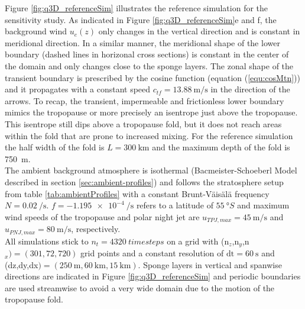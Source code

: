 Figure \ref{fig:q3D_referenceSim} illustrates the reference simulation for the sensitivity study. As indicated in Figure \ref{fig:q3D_referenceSim}e and f, the background wind $u_e(z)$ only changes in the vertical direction and is constant in meridional direction. In a similar manner, the meridional shape of the lower boundary (dashed lines in horizonal cross sections) is constant in the center of the domain and only changes close to the sponge layers. The zonal shape of the transient boundary is prescribed by the cosine function (equation (\ref{equ:cosMtn})) and it propagates with a constant speed $c_{tf}=\SI{13.88}{\meter\per\second}$ in the direction of the arrows. To recap, the transient, impermeable and frictionless lower boundary mimics the tropopause or more precisely an isentrope just above the tropopause. This isentrope still dips above a tropopause fold, but it does not reach areas within the fold that are prone to increased mixing. For the reference simulation the half width of the fold is $L = \SI{300}{\kilo\meter}$ and the maximum depth of the fold is \SI{750}{\meter}. \\
The ambient background atmosphere is isothermal (Bacmeister-Schoeberl Model described in section \ref{sec:ambient-profiles}) and follows the stratosphere setup from table \ref{tab:ambientProfiles} with a constant Brunt-Väisälä frequency $N=\SI{0.02}{\per\second}$. $f = \SI{-1.195e-4}{\per\second}$ refers to a latitude of $\SI{55}{\degree S}$ and maximum wind speeds of the tropopause and polar night jet are $u_{TPJ,max}=\SI{45}{\meter\per\second}$ and $u_{PNJ,max}=\SI{80}{\meter\per\second}$, respectively. \\
All simulations stick to $n_t=\SI{4320}{timesteps}$ on a grid with (n$_z$,n$_y$,n$_x)=(301,72,720)$ grid points and a constant resolution of $\mathrm{dt}=\SI{60}{\second}$ and (dz,dy,dx$)=(\SI{250}{\meter},\SI{60}{\kilo\meter},\SI{15}{\kilo\meter})$. Sponge layers in vertical and spanwise directions are indicated in Figure \ref{fig:q3D_referenceSim} and periodic boundaries are used streamwise to avoid a very wide domain due to the motion of the tropopause fold.
%
%
